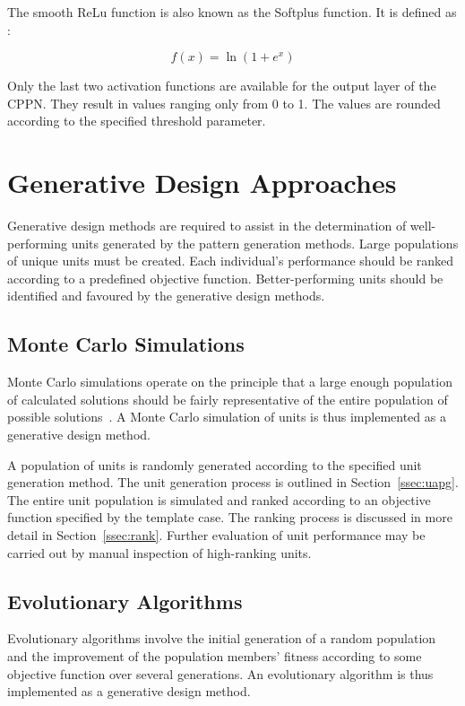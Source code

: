 The smooth ReLu function is also known as the Softplus function. It is defined as \citep{Dugas2001}:

\begin{equation}
	f\left ( x \right )=\ln \left ( 1+e^{x} \right )
\end{equation}

Only the last two activation functions are available for the output layer of the CPPN. They result in values ranging only from 0 to 1. The values are rounded according to the specified threshold parameter.

\section{Generative Design Approaches}
\label{sec:GD}

Generative design methods are required to assist in the determination of well-performing units generated by the pattern generation methods. Large populations of unique units must be created. Each individual's performance should be ranked according to a predefined objective function. Better-performing units should be identified and favoured by the generative design methods.

\subsection{Monte Carlo Simulations}

Monte Carlo simulations operate on the principle that a large enough population of calculated solutions should be fairly representative of the entire population of possible solutions~\citep{Metropolis1949}. A Monte Carlo simulation of units is thus implemented as a generative design method.

A population of units is randomly generated according to the specified unit generation method. The unit generation process is outlined in Section~\ref{ssec:uapg}. The entire unit population is simulated and ranked according to an objective function specified by the template case. The ranking process is discussed in more detail in Section~\ref{ssec:rank}. Further evaluation of unit performance may be carried out by manual inspection of high-ranking units.

\subsection{Evolutionary Algorithms}
\label{ssec:ea}

Evolutionary algorithms involve the initial generation of a random population and the improvement of the population members' fitness according to some objective function over several generations. An evolutionary algorithm is thus implemented as a generative design method.

